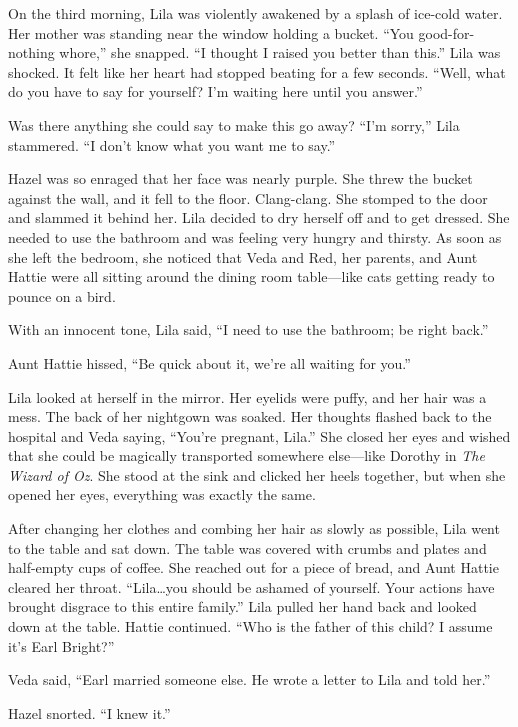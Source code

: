 \documentclass[
  letterpaper,
]{book}
\begin{document}
On the third morning, Lila was violently awakened by a splash of
ice-cold water. Her mother was standing near the window holding a
bucket. ``You good-for-nothing whore,'' she snapped. ``I thought I
raised you better than this.'' Lila was shocked. It felt like her heart
had stopped beating for a few seconds. ``Well, what do you have to say
for yourself? I'm waiting here until you answer.''

Was there anything she could say to make this go away? ``I'm sorry,''
Lila stammered. ``I don't know what you want me to say.''

Hazel was so enraged that her face was nearly purple. She threw the
bucket against the wall, and it fell to the floor. Clang-clang. She
stomped to the door and slammed it behind her. Lila decided to dry
herself off and to get dressed. She needed to use the bathroom and was
feeling very hungry and thirsty. As soon as she left the bedroom, she
noticed that Veda and Red, her parents, and Aunt Hattie were all sitting
around the dining room table---like cats getting ready to pounce on a
bird.

With an innocent tone, Lila said, ``I need to use the bathroom; be right
back.''

Aunt Hattie hissed, ``Be quick about it, we're all waiting for you.''

Lila looked at herself in the mirror. Her eyelids were puffy, and her
hair was a mess. The back of her nightgown was soaked. Her thoughts
flashed back to the hospital and Veda saying, ``You're pregnant, Lila.''
She closed her eyes and wished that she could be magically transported
somewhere else---like Dorothy in \emph{The Wizard of Oz}. She stood at
the sink and clicked her heels together, but when she opened her eyes,
everything was exactly the same.

After changing her clothes and combing her hair as slowly as possible,
Lila went to the table and sat down. The table was covered with crumbs
and plates and half-empty cups of coffee. She reached out for a piece of
bread, and Aunt Hattie cleared her throat. ``Lila\ldots you should be
ashamed of yourself. Your actions have brought disgrace to this entire
family.'' Lila pulled her hand back and looked down at the table. Hattie
continued. ``Who is the father of this child? I assume it's Earl
Bright?''

Veda said, ``Earl married someone else. He wrote a letter to Lila and
told her.''

Hazel snorted. ``I knew it.''
\end{document}
